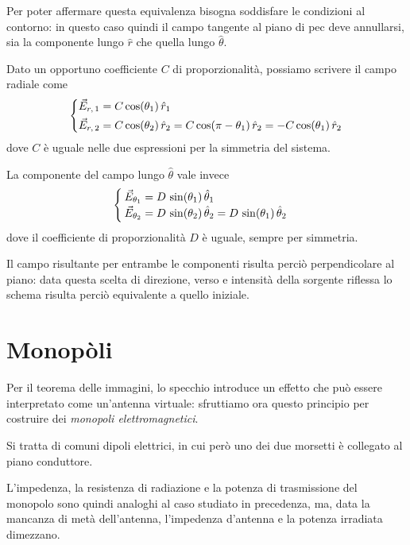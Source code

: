 Per poter affermare questa equivalenza bisogna soddisfare le condizioni al contorno: in questo caso quindi il campo tangente al piano di \gls{pec} deve annullarsi, sia la componente lungo $\hat{r}$ che quella lungo $\hat{\theta}$.

Dato un opportuno coefficiente $C$ di proporzionalità, possiamo scrivere il campo radiale come
\begin{equation}\begin{dcases}
	\vec{E}_{r,\, 1} = C \cos(\theta_1)\,\hat{r}_1 \\
	\vec{E}_{r,\, 2}
	= C \cos(\theta_2)\,\hat{r}_2
	= C \cos(\pi - \theta_1) \,\hat{r}_2
	= -C \cos(\theta_1) \,\hat{r}_2 \\
\end{dcases}\end{equation}
dove $C$ è uguale nelle due espressioni per la simmetria del sistema.

La componente del campo lungo $\hat{\theta}$ vale invece
\begin{equation}\begin{cases}
	\vec{E}_{\theta_1}
	= D \, \sin(\theta_1) \,\hat{\theta}_1 \\
	\vec{E}_{\theta_2}
	= D \, \sin(\theta_2)\,\hat{\theta}_2
	= D \, \sin(\theta_1) \,\hat{\theta}_2 \\
\end{cases}\end{equation}
dove il coefficiente di proporzionalità $D$ è uguale, sempre per simmetria.

Il campo risultante per entrambe le componenti risulta perciò perpendicolare al piano: data questa scelta di direzione, verso e intensità della sorgente riflessa lo schema risulta perciò equivalente a quello iniziale.

\clearpage
\section{Monopòli}

Per il teorema delle immagini, lo specchio introduce un effetto che può essere interpretato come un'antenna virtuale: sfruttiamo ora questo principio per costruire dei \emph{monopoli elettromagnetici}.

Si tratta di comuni dipoli elettrici, in cui però uno dei due morsetti è collegato al piano conduttore.

L'impedenza, la resistenza di radiazione e la potenza di trasmissione del monopolo sono quindi analoghi al caso studiato in precedenza, ma, data la mancanza di metà dell'antenna, l'impedenza d'antenna e la potenza irradiata dimezzano.

